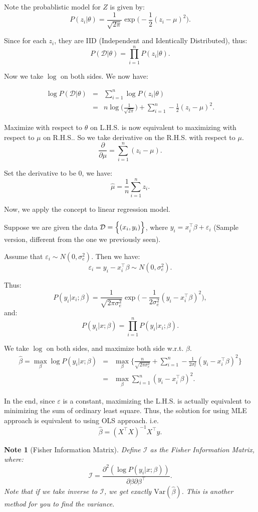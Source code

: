\documentclass{article}
\theoremstyle{MyNonumberplain}
\theoremstyle{break}
\newcommand{\ve}{\varepsilon}
\newcommand{\var}{\text{Var}}
\newcommand{\T}{^\intercal}
\newcommand{\D}{\mathcal{D}}
\theoremstyle{break}
\newtheorem{note}{Note}
\theoremstyle{break}
\theoremstyle{break}
\begin{document}
Note the probablistic model for $Z$ is given by:
$$P(z_i|\theta)=\frac{1}{\sqrt{2\pi}}\exp\Biggl(-\frac{1}{2}(z_i-\mu)^2\Biggr).$$

Since for each $z_i$, they are IID (Independent and Identically Distributed), thus: 
$$P(\D|\theta)=\prod_{i=1}^n P(z_i|\theta).$$

Now we take $\log$ on both sides. We now have:

\begin{eqnarray*}
    \log P(\D|\theta)&=&\sum_{i=1}^n \log P(z_i|\theta)\\
                     &=&n\log\Biggl(\frac{1}{\sqrt{2\pi}}\Biggr) + \sum_{i=1}^n -\frac{1}{2}(z_i-\mu)^2.
\end{eqnarray*}

Maximize with respect to $\theta$ on L.H.S. is now equivalent to maximizing with respect to $\mu$ on R.H.S.. So we take derivative on the R.H.S. with respect to $\mu$.
$$\frac{\partial}{\partial\mu} =  \sum_{i=1}^n (z_i-\mu).$$

Set the derivative to be 0, we have:
$$\hat\mu=\frac{1}{n}\sum_{i=1}^n z_i.$$

Now, we apply the concept to linear regression model.

Suppose we are given the data $\D=\Bigl\{(x_i,y_i)\Bigr\}$, where $y_i=x_i\T\beta+\ve_i$ (Sample version, different from the one we previously seen).

Assume that $\ve_i\sim N(0,\sigma_e^2)$. Then we have:
$$\ve_i=y_i-x_i\T\beta\sim N(0,\sigma_e^2).$$

Thus:
$$P(y_i|x_i;\beta)=\frac{1}{\sqrt{2\pi\sigma_e^2}}\exp\Biggl(-\frac{1}{2\sigma_e^2}(y_i-x_i\T\beta)^2\Biggr),$$
and:
$$P(y_i|x;\beta)=\prod_{i=1}^{n}P(y_i|x_i;\beta).$$

We take $\log$ on both sides, and maximize both side w.r.t. $\beta$.
\begin{eqnarray*}
    \hat\beta=\max_\beta\log P(y_i|x;\beta)&=&\max_\beta\Biggl\{\frac{n}{\sqrt{2\pi\sigma_e^2}} + \sum_{i=1}^{n}-\frac{1}{2\sigma_e^2} (y_i-x_i\T\beta)^2\Biggr\}\\
    &=&\max_\beta\sum_{i=1}^{n} (y_i-x_i\T\beta)^2.
\end{eqnarray*}

In the end, since $\ve$ is a constant, maximizing the L.H.S. is actually equivalent to minimizing the sum of ordinary least square.
Thus, the solution for using MLE approach is equivalent to using OLS approach. i.e. $$\hat\beta=(X\T X)^{-1}X\T y.$$

\begin{notebox}
    \begin{note}[Fisher Information Matrix]
        Define $\mathcal{I}$ as the Fisher Information Matrix, where: $$\mathcal{I}=\frac{\partial^2 (\log P(y_i|x;\beta))}{\partial\beta\partial\beta\T}.$$
        Note that if we take inverse to $\mathcal{I}$, we get exactly $\var(\hat\beta)$. This is another method for you to find the variance.
    \end{note}
\end{notebox}
\end{document}
